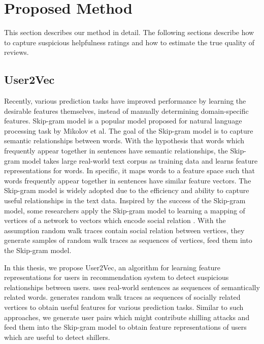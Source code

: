 \documentclass[master,english,final]{kaist-ucs}
\begin{document}
\chapter{Proposed Method}
This section describes our method in detail.
The following sections describe how to capture suspicious helpfulness ratings and how to estimate the true quality of reviews.

\section{User2Vec}
Recently, various prediction tasks \cite{Word2Vec,NegativeSampling,DeepWalk,Node2Vec} have improved performance by learning the desirable features themselves, instead of manually determining domain-specific features.
Skip-gram model \cite{Word2Vec} is a popular model proposed for natural language processing task by Mikolov et al.
The goal of the Skip-gram model is to capture semantic relationships between words.
With the hypothesis that words which frequently appear together in sentences have semantic relationships, the Skip-gram model takes large real-world text corpus as training data and learns feature representations for words.
In specific, it maps words to a feature space such that words frequently appear together in sentences have similar feature vectors.
The Skip-gram model is widely adopted due to the efficiency and ability to capture useful relationships in the text data.
Inspired by the success of the Skip-gram model, some researchers apply the Skip-gram model to learning a mapping of vertices of a network to vectors which encode social relation \cite{DeepWalk,Node2Vec}.
With the assumption random walk traces contain social relation between vertices, they generate samples of random walk traces as sequences of vertices, feed them into the Skip-gram model.

In this thesis, we propose User2Vec, an algorithm for learning feature representations for users in recommendation system to detect suspicious relationships between users.
\cite{Word2Vec} uses real-world sentences as sequences of semantically related words.
\cite{DeepWalk,Node2Vec} generates random walk traces as sequences of socially related vertices to obtain useful features for various prediction tasks.
Similar to such approaches, we generate user pairs which might contribute shilling attacks and feed them into the Skip-gram model to obtain feature representations of users which are useful to detect shillers.
\end{document}
